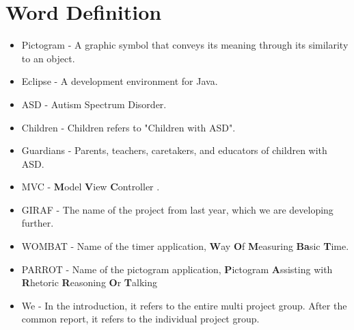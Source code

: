 
\chapter*{Word Definition}

\begin{itemize}

	\item Pictogram - A graphic symbol that conveys its meaning through its similarity to an object.
	\item Eclipse - A development environment for Java.
	\item ASD - Autism Spectrum Disorder.
	\item Children - Children refers to "Children with ASD".
	\item Guardians - Parents, teachers, caretakers, and educators of children with ASD.
	\item MVC - \textbf{M}odel \textbf{V}iew \textbf{C}ontroller \cite{MVC}.
	\item GIRAF - The name of the project from last year, which we are developing further.
	\item WOMBAT - Name of the timer application, \textbf{W}ay \textbf{O}f \textbf{M}easuring \textbf{Ba}sic \textbf{T}ime.
	\item PARROT - Name of the pictogram application, \textbf{P}ictogram \textbf{A}ssisting with \textbf{R}hetoric \textbf{R}easoning \textbf{O}r \textbf{T}alking
	\item We - In the introduction, it refers to the entire multi project group. After the common report, it refers to the individual project group.

\end{itemize}